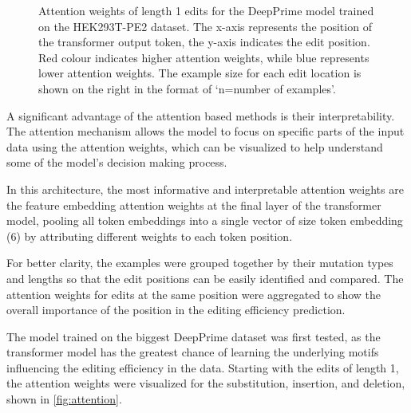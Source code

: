 \begin{figure}
    \centering
    \caption[Attention weights for the DeepPrime model trained on the HEK293T-PE2 dataset]{Attention weights of length 1 edits for the DeepPrime model trained on the HEK293T-PE2 dataset. The x-axis represents the position of the transformer output token, the y-axis indicates the edit position. Red colour indicates higher attention weights, while blue represents lower attention weights. The example size for each edit location is shown on the right in the format of `n=number of examples'.}
    \label{fig:attention}
\end{figure}

A significant advantage of the attention based methods is their interpretability. The attention mechanism allows the model to focus on specific parts of the input data using the attention weights, which can be visualized to help understand some of the model's decision making process. 

In this architecture, the most informative and interpretable attention weights are the feature embedding attention weights at the final layer of the transformer model, pooling all token embeddings into a single vector of size token embedding (6) by attributing different weights to each token position. 

For better clarity, the examples were grouped together by their mutation types and lengths so that the edit positions can be easily identified and compared. The attention weights for edits at the same position were aggregated to show the overall importance of the position in the editing efficiency prediction.

The model trained on the biggest DeepPrime dataset was first tested, as the transformer model has the greatest chance of learning the underlying motifs influencing the editing efficiency in the data. Starting with the edits of length 1, the attention weights were visualized for the substitution, insertion, and deletion, shown in \autoref{fig:attention}. 

